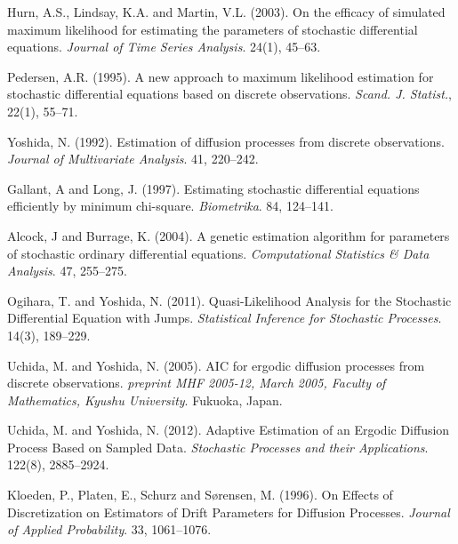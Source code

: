 \begin{thebibliography}{1}
Hurn, A.S., Lindsay, K.A. and Martin, V.L. (2003).
\newblock On the efficacy of simulated maximum likelihood for estimating the parameters of stochastic differential equations.
\newblock \emph{Journal of Time Series Analysis}. 24(1), 45--63.

Pedersen, A.R. (1995).
\newblock A new approach to maximum likelihood estimation for stochastic differential equations based on discrete observations.
\newblock \emph{Scand. J. Statist.}, 22(1), 55--71.

Yoshida, N. (1992).
\newblock Estimation of diffusion processes from discrete observations.
\newblock \emph{Journal of Multivariate Analysis}. 41, 220--242.

Gallant, A and Long, J. (1997).
\newblock Estimating stochastic differential equations efficiently by minimum chi-square.
\newblock \emph{Biometrika}. 84, 124--141.

Alcock, J and Burrage, K. (2004).
\newblock A genetic estimation algorithm for parameters of stochastic ordinary differential equations.
\newblock \emph{Computational Statistics \& Data Analysis}. 47, 255--275.

Ogihara, T. and Yoshida, N. (2011).
\newblock  Quasi-Likelihood Analysis for the Stochastic Differential Equation with Jumps.
\newblock \emph{Statistical Inference for Stochastic Processes}. 14(3), 189--229.

Uchida, M. and Yoshida, N. (2005).
\newblock AIC for ergodic diffusion processes from discrete observations.
\newblock \emph{preprint MHF 2005-12, March 2005, Faculty of Mathematics, Kyushu University}. Fukuoka, Japan.

Uchida, M. and Yoshida, N. (2012).
\newblock Adaptive Estimation of an Ergodic Diffusion Process Based on Sampled Data.
\newblock \emph{Stochastic Processes and their Applications}. 122(8), 2885--2924.

Kloeden, P., Platen, E., Schurz and S{\o}rensen, M. (1996).
\newblock On Effects of Discretization on Estimators of Drift Parameters for Diffusion Processes.
\newblock \emph{Journal of Applied Probability}. 33, 1061--1076.

\end{thebibliography}



